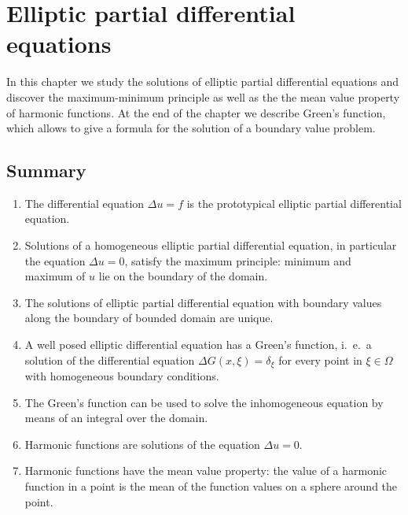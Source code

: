 %
%
%
\chapter{Elliptic partial differential equations\label{chapter-elliptisch}}
In this chapter we study the solutions of elliptic partial differential
equations and discover the maximum-minimum principle as well as the
the mean value property of harmonic functions.
At the end of the chapter we describe Green's function, which allows
to give a formula for the solution of a boundary value problem.









\section{Summary}
\begin{enumerate}
\item
The differential equation $\Delta u=f$ is the prototypical elliptic
partial differential equation.
\item
Solutions of a homogeneous elliptic partial differential equation,
in particular the equation $\Delta u=0$, satisfy the maximum principle:
minimum and maximum of $u$ lie on the boundary of the domain.
\item
The solutions of elliptic partial differential equation with boundary
values along the boundary of bounded domain are unique.
\item
A well posed elliptic differential equation has a Green's function,
i.~e.~a solution of the differential equation
$\Delta G(x,\xi)=\delta_\xi$ for every point in $\xi\in\Omega$
with homogeneous boundary conditions.
\item
The Green's function can be used to solve the inhomogeneous equation
by means of an integral over the domain.
\item
Harmonic functions are solutions of the equation $\Delta u=0$.
\item
Harmonic functions have the mean value property: the value of a harmonic
function in a point is the mean of the function values on a sphere around
the point.
\end{enumerate}


